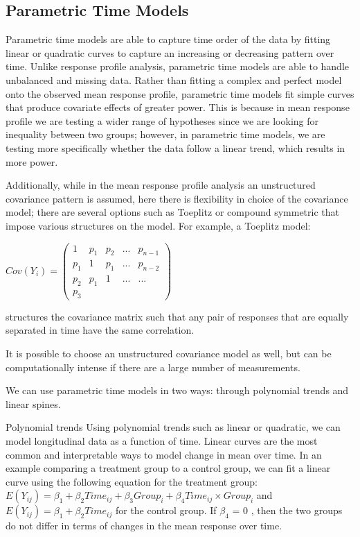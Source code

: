 \documentclass[12pt, twoside]{amherstthesis}
\theoremstyle{definition}
\theoremstyle{definition}
\theoremstyle{definition}
\theoremstyle{remark}
\begin{document}
\hypertarget{parametric-time-models}{%
\subsection{Parametric Time Models}\label{parametric-time-models}}

Parametric time models are able to capture time order of the data by fitting linear or quadratic curves to capture an increasing or decreasing pattern over time. Unlike response profile analysis, parametric time models are able to handle unbalanced and missing data. Rather than fitting a complex and perfect model onto the observed mean response profile, parametric time models fit simple curves that produce covariate effects of greater power. This is because in mean response profile we are testing a wider range of hypotheses since we are looking for inequality between two groups; however, in parametric time models, we are testing more specifically whether the data follow a linear trend, which results in more power.

Additionally, while in the mean response profile analysis an unstructured covariance pattern is assumed, here there is flexibility in choice of the covariance model; there are several options such as Toeplitz or compound symmetric that impose various structures on the model. For example, a Toeplitz model:

\(Cov (Y_i) = \begin{pmatrix} 1 & p_1 & p_2 & ... & p_{n-1} \\ p_1 & 1 & p_1 & ... & p_{n-2} \\ p_2 & p_1 & 1 & ...& ... \\ p_3 \end{pmatrix}\)

structures the covariance matrix such that any pair of responses that are equally separated in time have the same correlation.

It is possible to choose an unstructured covariance model as well, but can be computationally intense if there are a large number of measurements.

We can use parametric time models in two ways: through polynomial trends and linear spines.

Polynomial trends
Using polynomial trends such as linear or quadratic, we can model longitudinal data as a function of time. Linear curves are the most common and interpretable ways to model change in mean over time. In an example comparing a treatment group to a control group, we can fit a linear curve using the following equation for the treatment group: \(E(Y_{ij}) = \beta_1 + \beta_2Time_{ij}+\beta_3Group_i+\beta_4Time_{ij} \times Group_i\) and
\(E(Y_{ij}) = \beta_1 + \beta_2Time_{ij}\) for the control group. If \(\beta_4\) = 0 , then the two groups do not differ in terms of changes in the mean response over time.
\end{document}
